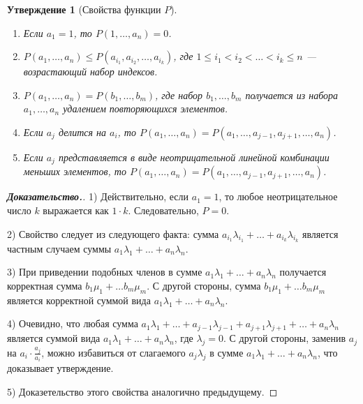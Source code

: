 \documentclass[12pt]{article}
\newtheorem{proposition}[theorem]{Утверждение}
\theoremstyle{definition}
\begin{document}
\begin{proposition}[Свойства функции $P$]{\ }
\label{propertiesOfP}
\begin{enumerate}
    \item Если $a_1 = 1$, то $P(1, \dots, a_n) = 0$.
    \item $P(a_1, \dots, a_n) \le P(a_{i_1} , a_{i_2}, \dots, a_{i_k})$, где $1 \le i_1 < i_2 < \dots < i_k \le n$ --- возрастающий набор индексов.
    \item $P(a_1, \dots, a_n) = P(b_1, \dots, b_m)$, где набор $b_1, \dots, b_m$ получается из набора $a_1, \dots, a_n$ удалением повторяющихся элементов.
    \item Если $a_j$ делится на $a_i$, то $P(a_1, \dots, a_n) = P(a_1, \dots, a_{j - 1}, a_{j + 1}, \dots, a_n)$.
    
    \item Если $a_j$ представляется в виде неотрицательной линейной комбинации меньших элементов, то $P(a_1, \dots, a_n) = P(a_1, \dots, a_{j - 1}, a_{j + 1}, \dots, a_n)$.
\end{enumerate}
\end{proposition}
\begin{proof}[\textbf{Доказательство.}]
1) Действительно, если $a_1 = 1$, то любое неотрицательное число $k$ выражается как $1 \cdot k$. Следовательно, $P = 0$.

2) Свойство следует из следующего факта: сумма $a_{i_1} \lambda_{i_1} + \dots + a_{i_k}\lambda_{i_k}$ является частным случаем суммы $a_1 \lambda_1 + \dots + a_n \lambda_n$.

3) При приведении подобных членов в сумме $a_1 \lambda_1 + \dots + a_n \lambda_n$ получается корректная сумма $b_1 \mu_1 + \dots b_m \mu_m$. С другой стороны, сумма $b_1 \mu_1 + \dots b_m \mu_m$ является корректной суммой вида $a_1 \lambda_1 + \dots + a_n \lambda_n$.

4) Очевидно, что любая сумма $a_1 \lambda_1 + \dots + a_{j - 1} \lambda_{j - 1} + a_{j + 1} \lambda_{j + 1} + \dots +a_n \lambda_n$ является суммой вида $a_1 \lambda_1 + \dots + a_n \lambda_n$, где $\lambda_j = 0$. С другой стороны, заменив $a_j$ на $a_i \cdot \frac{a_j}{a_i}$, можно избавиться от слагаемого $a_j \lambda_j$ в сумме $a_1 \lambda_1 + \dots + a_n \lambda_n$, что доказывает утверждение.

5) Доказетельство этого свойства аналогично предыдущему.
\end{proof}
\end{document}
